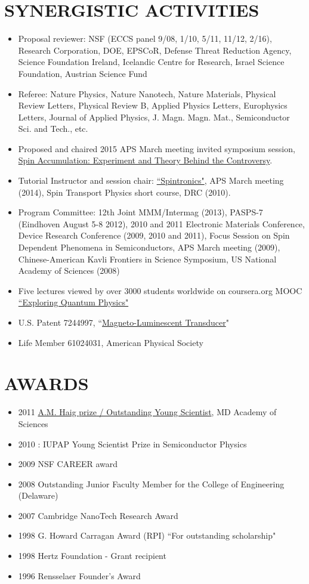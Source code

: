 \documentclass[paper=letter,fontsize=11pt]{scrartcl} %
\newcommand{\NewPart}[2]{\section*{\uppercase{#1} #2}}
\begin{document}
\NewPart{Synergistic Activities}{}
\begin{itemize}
\item Proposal reviewer: NSF (ECCS panel 9/08, 1/10, 5/11, 11/12, 2/16), Research Corporation, DOE, EPSCoR, Defense Threat Reduction Agency, Science Foundation Ireland, Icelandic Centre for Research, Israel Science Foundation, Austrian Science Fund
\item Referee: Nature Physics, Nature Nanotech, Nature Materials, Physical Review Letters, Physical Review B, Applied Physics Letters, Europhysics Letters, Journal of Applied Physics, J. Magn. Magn. Mat., Semiconductor Sci. and Tech., etc.
\item Proposed and chaired 2015 APS March meeting invited symposium session, \href{http://meeting.aps.org/Meeting/MAR15/Session/Y20}{Spin Accumulation: Experiment and Theory Behind the Controversy}.
\item Tutorial Instructor and session chair: \href{http://appelbaum.physics.umd.edu/docs/ppt/Appelbaum_102414.pdf}{``Spintronics"}, APS March meeting (2014), Spin Transport Physics short course, DRC (2010).
\item Program Committee: 12th Joint MMM/Intermag (2013), PASPS-7 (Eindhoven August 5-8 2012), 2010 and 2011 Electronic Materials Conference, Device Research Conference (2009, 2010 and 2011), Focus Session on Spin Dependent Phenomena in Semiconductors, APS March meeting (2009), Chinese-American Kavli Frontiers in Science Symposium, US National Academy of Sciences (2008)
\item Five lectures viewed by over 3000 students worldwide on coursera.org MOOC \href{https://www.coursera.org/course/eqp}{``Exploring Quantum Physics"}
\item U.S. Patent 7244997, ``\href{http://www.google.com/patents/US7244997}{Magneto-Luminescent Transducer}"
\item Life Member 61024031, American Physical Society
\end{itemize}

\NewPart{Awards}{}
\begin{itemize}
\item 2011 \href{http://www.mdsci.org/programs/outstanding-young-scientist-outstanding-young-engineer/past-oys-recipients/}{A.M. Haig prize / Outstanding Young Scientist}, MD Academy of Sciences
\item 2010 :  IUPAP Young Scientist Prize in Semiconductor Physics 
\item 2009 NSF CAREER award
\item 2008 Outstanding Junior Faculty Member for the College of Engineering (Delaware)
\item 2007 Cambridge NanoTech Research Award 
\item 1998 G. Howard Carragan Award (RPI) ``For outstanding scholarship"
\item 1998 Hertz Foundation - Grant recipient
\item 1996 Rensselaer Founder's Award
\end{itemize}
\end{document}
